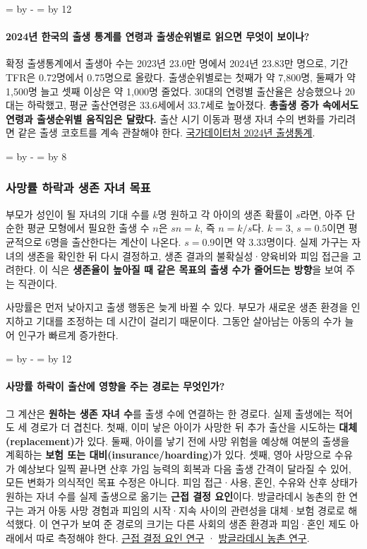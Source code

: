 \documentclass[10pt,a4paper]{article}
\newcommand{\ReserveQuestionSpace}{%
  \par\begingroup
  \dimen0=\pagegoal \advance\dimen0 by -\pagetotal
  \dimen2=\baselineskip \multiply\dimen2 by 12
  \ifdim\dimen0<\dimen2 \newpage\fi
  \endgroup}
\newcommand{\ReserveReadingSectionSpace}{%
  \par\begingroup
  \dimen0=\pagegoal \advance\dimen0 by -\pagetotal
  \dimen2=\baselineskip \multiply\dimen2 by 8
  \ifdim\dimen0<\dimen2 \newpage\fi
  \endgroup}
\begin{document}
\ReserveQuestionSpace
\paragraph{2024년 한국의 출생 통계를 연령과 출생순위별로 읽으면 무엇이 보이나?}
확정 출생통계에서 출생아 수는 2023년 23.0만 명에서 2024년 23.83만 명으로, 기간 TFR은 0.72명에서 0.75명으로 올랐다. 출생순위별로는 첫째가 약 7,800명, 둘째가 약 1,500명 늘고 셋째 이상은 약 1,000명 줄었다. 30대의 연령별 출산율은 상승했으나 20대는 하락했고, 평균 출산연령은 33.6세에서 33.7세로 높아졌다. \textbf{총출생 증가 속에서도 연령과 출생순위별 움직임은 달랐다.} 출산 시기 이동과 평생 자녀 수의 변화를 가리려면 같은 출생 코호트를 계속 관찰해야 한다. \href{https://mods.go.kr/boardDownload.es?bid=11773\&list\_no=439008\&seq=2}{국가데이터처 2024년 출생통계}.\par

\ReserveReadingSectionSpace
\subsubsection*{사망률 하락과 생존 자녀 목표}

부모가 성인이 될 자녀의 기대 수를 $k$명 원하고 각 아이의 생존 확률이 $s$라면, 아주 단순한 평균 모형에서 필요한 출생 수 $n$은 $sn=k$, 즉 $n=k/s$다. $k=3$, $s=0.5$이면 평균적으로 6명을 출산한다는 계산이 나온다. $s=0.9$이면 약 3.33명이다. 실제 가구는 자녀의 생존을 확인한 뒤 다시 결정하고, 생존 결과의 불확실성·양육비와 피임 접근을 고려한다. 이 식은 \textbf{생존율이 높아질 때 같은 목표의 출생 수가 줄어드는 방향}을 보여 주는 직관이다.\par

사망률은 먼저 낮아지고 출생 행동은 늦게 바뀔 수 있다. 부모가 새로운 생존 환경을 인지하고 기대를 조정하는 데 시간이 걸리기 때문이다. 그동안 살아남는 아동의 수가 늘어 인구가 빠르게 증가한다.\par

\ReserveQuestionSpace
\paragraph{사망률 하락이 출산에 영향을 주는 경로는 무엇인가?}
그 계산은 \textbf{원하는 생존 자녀 수}를 출생 수에 연결하는 한 경로다. 실제 출생에는 적어도 세 경로가 더 겹친다. 첫째, 이미 낳은 아이가 사망한 뒤 추가 출산을 시도하는 \textbf{대체(replacement)}가 있다. 둘째, 아이를 낳기 전에 사망 위험을 예상해 여분의 출생을 계획하는 \textbf{보험 또는 대비(insurance/hoarding)}가 있다. 셋째, 영아 사망으로 수유가 예상보다 일찍 끝나면 산후 가임 능력의 회복과 다음 출생 간격이 달라질 수 있어, 모든 변화가 의식적인 목표 수정은 아니다. 피임 접근·사용, 혼인, 수유와 산후 상태가 원하는 자녀 수를 실제 출생으로 옮기는 \textbf{근접 결정 요인}이다. 방글라데시 농촌의 한 연구는 과거 아동 사망 경험과 피임의 시작·지속 사이의 관련성을 대체·보험 경로로 해석했다. 이 연구가 보여 준 경로의 크기는 다른 사회의 생존 환경과 피임·혼인 제도 아래에서 따로 측정해야 한다. \href{https://www.sciencedirect.com/science/article/pii/0160791X87900030}{근접 결정 요인 연구} · \href{https://pubmed.ncbi.nlm.nih.gov/9789320/}{방글라데시 농촌 연구}.\par
\end{document}
